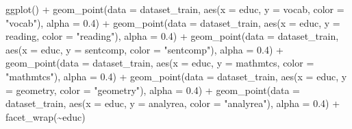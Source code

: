 \documentclass[
]{article}
\newenvironment{Shaded}{\begin{snugshade}}{\end{snugshade}}
\newcommand{\AttributeTok}[1]{\textcolor[rgb]{0.77,0.63,0.00}{#1}}
\newcommand{\FloatTok}[1]{\textcolor[rgb]{0.00,0.00,0.81}{#1}}
\newcommand{\FunctionTok}[1]{\textcolor[rgb]{0.00,0.00,0.00}{#1}}
\newcommand{\NormalTok}[1]{#1}
\newcommand{\SpecialCharTok}[1]{\textcolor[rgb]{0.00,0.00,0.00}{#1}}
\newcommand{\StringTok}[1]{\textcolor[rgb]{0.31,0.60,0.02}{#1}}
\begin{document}
\begin{Shaded}
\begin{Highlighting}[]
\FunctionTok{ggplot}\NormalTok{() }\SpecialCharTok{+} \FunctionTok{geom\_point}\NormalTok{(}\AttributeTok{data =}\NormalTok{ dataset\_train, }\FunctionTok{aes}\NormalTok{(}\AttributeTok{x =}\NormalTok{ educ, }\AttributeTok{y =}\NormalTok{ vocab,}
    \AttributeTok{color =} \StringTok{"vocab"}\NormalTok{), }\AttributeTok{alpha =} \FloatTok{0.4}\NormalTok{) }\SpecialCharTok{+} \FunctionTok{geom\_point}\NormalTok{(}\AttributeTok{data =}\NormalTok{ dataset\_train,}
    \FunctionTok{aes}\NormalTok{(}\AttributeTok{x =}\NormalTok{ educ, }\AttributeTok{y =}\NormalTok{ reading, }\AttributeTok{color =} \StringTok{"reading"}\NormalTok{), }\AttributeTok{alpha =} \FloatTok{0.4}\NormalTok{) }\SpecialCharTok{+}
    \FunctionTok{geom\_point}\NormalTok{(}\AttributeTok{data =}\NormalTok{ dataset\_train, }\FunctionTok{aes}\NormalTok{(}\AttributeTok{x =}\NormalTok{ educ, }\AttributeTok{y =}\NormalTok{ sentcomp,}
        \AttributeTok{color =} \StringTok{"sentcomp"}\NormalTok{), }\AttributeTok{alpha =} \FloatTok{0.4}\NormalTok{) }\SpecialCharTok{+} \FunctionTok{geom\_point}\NormalTok{(}\AttributeTok{data =}\NormalTok{ dataset\_train,}
    \FunctionTok{aes}\NormalTok{(}\AttributeTok{x =}\NormalTok{ educ, }\AttributeTok{y =}\NormalTok{ mathmtcs, }\AttributeTok{color =} \StringTok{"mathmtcs"}\NormalTok{), }\AttributeTok{alpha =} \FloatTok{0.4}\NormalTok{) }\SpecialCharTok{+}
    \FunctionTok{geom\_point}\NormalTok{(}\AttributeTok{data =}\NormalTok{ dataset\_train, }\FunctionTok{aes}\NormalTok{(}\AttributeTok{x =}\NormalTok{ educ, }\AttributeTok{y =}\NormalTok{ geometry,}
        \AttributeTok{color =} \StringTok{"geometry"}\NormalTok{), }\AttributeTok{alpha =} \FloatTok{0.4}\NormalTok{) }\SpecialCharTok{+} \FunctionTok{geom\_point}\NormalTok{(}\AttributeTok{data =}\NormalTok{ dataset\_train,}
    \FunctionTok{aes}\NormalTok{(}\AttributeTok{x =}\NormalTok{ educ, }\AttributeTok{y =}\NormalTok{ analyrea, }\AttributeTok{color =} \StringTok{"analyrea"}\NormalTok{), }\AttributeTok{alpha =} \FloatTok{0.4}\NormalTok{) }\SpecialCharTok{+}
    \FunctionTok{facet\_wrap}\NormalTok{(}\SpecialCharTok{\textasciitilde{}}\NormalTok{educ)}
\end{Highlighting}
\end{Shaded}
\end{document}
